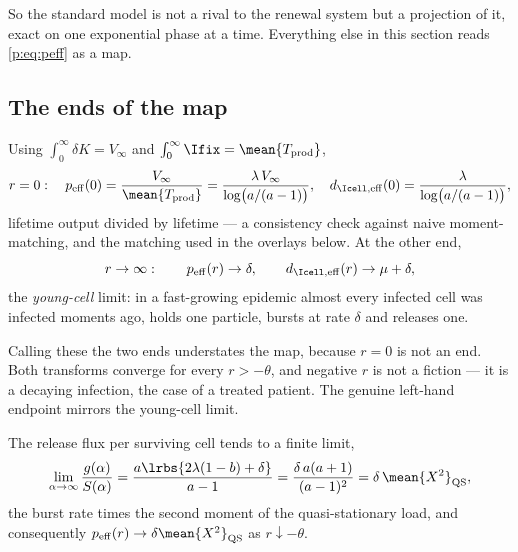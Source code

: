 \noindent
So the standard model is not a rival to the renewal system but a projection
of it, exact on one exponential phase at a time. Everything else in this
section reads \cref{p:eq:peff} as a map.

\subsection{The ends of the map}

Using $\int_0^\infty\delta K=V_\infty$ and
$\int_0^\infty\Ifix=\mean{T_{\rm prod}}$,
\begin{equation}
r=0:\quad
p_{\rm eff}(0)=\frac{V_\infty}{\mean{T_{\rm prod}}}
=\frac{\lambda\,V_\infty}{\log\bigl(a/(a-1)\bigr)},
\quad
d_{\Icell,{\rm eff}}(0)=\frac{\lambda}{\log\bigl(a/(a-1)\bigr)},
\label{p:eq:peff0}
\end{equation}
lifetime output divided by lifetime --- a consistency check against naive
moment-matching, and the matching used in the overlays below. At the other
end,
\begin{equation}
r\to\infty:\qquad
p_{\rm eff}(r)\to\delta,
\qquad
d_{\Icell,{\rm eff}}(r)\to\mu+\delta,
\label{p:eq:peffinf}
\end{equation}
the \emph{young-cell} limit: in a fast-growing epidemic almost every
infected cell was infected moments ago, holds one particle, bursts at rate
$\delta$ and releases one.

Calling these the two ends understates the map, because $r=0$ is not an end.
Both transforms converge for every $r>-\theta$, and negative $r$ is not a
fiction --- it is a decaying infection, the case of a treated patient. The
genuine left-hand endpoint mirrors the young-cell limit.

\begin{proposition}
\label{p:prop:oldcell}
The release flux per surviving cell tends to a finite limit,
\begin{equation}
\lim_{\alpha\to\infty}\frac{g(\alpha)}{S(\alpha)}
=\frac{a\lrbs{2\lambda(1-b)+\delta}}{a-1}
=\frac{\delta\,a(a+1)}{(a-1)^2}
=\delta\,\mean{X^2}_{\rm QS},
\label{p:eq:oldcell}
\end{equation}
the burst rate times the second moment of the quasi-stationary load, and
consequently $p_{\rm eff}(r)\to\delta\mean{X^2}_{\rm QS}$ as
$r\downarrow-\theta$.
\end{proposition}

